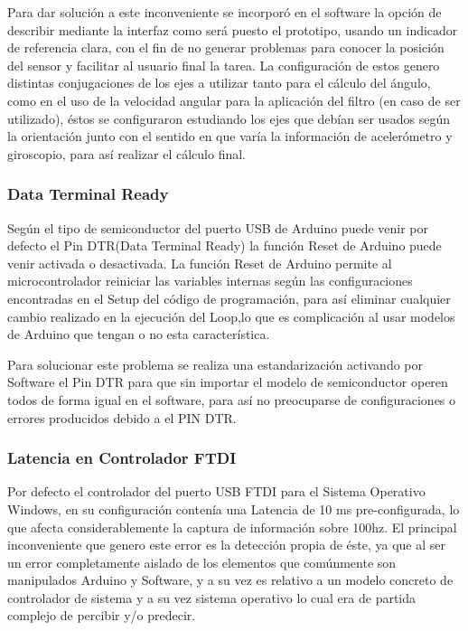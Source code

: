 \documentclass[12pt,a4paper]{article}
\begin{document}
Para dar solución a este inconveniente se incorporó en el software la opción de describir mediante la interfaz como será puesto el prototipo, usando un indicador de referencia clara, con el fin de no generar problemas para conocer la posición del sensor y facilitar al usuario final la tarea.
    La configuración de estos genero distintas conjugaciones de los ejes a utilizar tanto para el cálculo del ángulo, como en el uso de la velocidad angular para la aplicación del filtro (en caso de ser utilizado), éstos se configuraron estudiando los ejes que debían ser usados según la orientación junto con el sentido en que varía la información de acelerómetro y giroscopio, para así realizar el cálculo final.

\subsubsection{Data Terminal Ready}
	Según el tipo de semiconductor del puerto USB de Arduino puede venir por defecto el Pin DTR(Data Terminal Ready) la función Reset de Arduino puede venir activada o desactivada. 
    La función Reset de Arduino permite al microcontrolador reiniciar las variables internas según las configuraciones encontradas en el Setup del código de programación, para así eliminar cualquier cambio realizado en la ejecución del Loop,lo que es complicación al usar modelos de Arduino que tengan o no esta característica.

Para solucionar este problema se realiza una estandarización activando por Software el Pin DTR para que sin importar el modelo de semiconductor operen todos de forma igual en el software, para así no preocuparse de configuraciones o errores producidos debido a el PIN DTR.

\subsubsection{Latencia en Controlador FTDI}
Por defecto el controlador del puerto USB FTDI para el Sistema Operativo Windows, en su configuración contenía una Latencia de 10 ms pre-configurada, lo que afecta considerablemente la captura de información sobre 100hz. El principal inconveniente que genero este error es la detección propia de éste, ya que al ser un error completamente aislado de los elementos que comúnmente son manipulados Arduino y Software, y a su vez es relativo a un modelo concreto de controlador de sistema y a su vez sistema operativo lo cual era de partida complejo de percibir y/o predecir.
	
\end{document}
